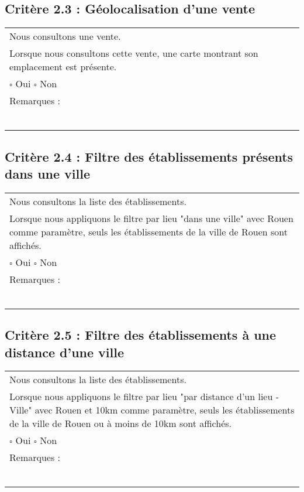   	\subsection*{Critère 2.3 : Géolocalisation d'une vente}
  		\begin{center}
    	 		\begin{tabular}[h]{|p{}|}
			\hline
				Nous consultons une vente. \\
				Lorsque nous consultons cette vente, une carte montrant son emplacement est présente. \\
						
				$\square$ Oui  \hfill \hfill $\square$ Non \\\hline Remarques : \\ ~\\
			 \\\hline
     		\end{tabular}
  		\end{center}	
  		
  	\subsection*{Critère 2.4 : Filtre des établissements présents dans une ville}
  		\begin{center}
    	 		\begin{tabular}[h]{|p{}|}
			\hline
				Nous consultons la liste des établissements. \\
				Lorsque nous appliquons le filtre par lieu "dans une ville" avec Rouen comme paramètre, seuls les établissements de la ville de Rouen sont affichés. \\
						
				$\square$ Oui  \hfill \hfill $\square$ Non \\\hline Remarques : \\ ~\\
			 \\\hline
     		\end{tabular}
  		\end{center}	
  		
  	\subsection*{Critère 2.5 : Filtre des établissements à une distance d'une ville}
  		\begin{center}
    	 		\begin{tabular}[h]{|p{}|}
			\hline
				Nous consultons la liste des établissements. \\
				Lorsque nous appliquons le filtre par lieu "par distance d'un lieu - Ville" avec Rouen et 10km comme paramètre, seuls les établissements de la ville de Rouen ou à moins de 10km sont affichés. \\
						
				$\square$ Oui  \hfill \hfill $\square$ Non \\\hline Remarques : \\ ~\\
			 \\\hline
     		\end{tabular}
  		\end{center}	
  		
